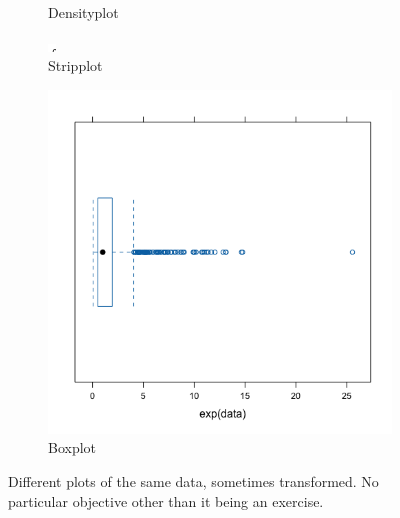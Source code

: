 \documentclass[10pt, fullpage, a4paper, titlepage]{article}
\begin{document}
\begin{figure}[h]
\begin{subfigure}{0.4\linewidth}
\caption{Densityplot}
\end{subfigure}
\hfill
\begin{subfigure}{0.4\linewidth}
\centering
\includegraphics[width = \linewidth]{stripplot.png}
\caption{Stripplot}
\end{subfigure}
\hfill
\begin{subfigure}{0.4\linewidth}
\centering
\includegraphics[width = \linewidth]{bwplot.png}
\caption{Boxplot}
\end{subfigure}
\caption{Different plots of the same data, sometimes transformed. No particular objective other than it being an exercise.}
\end{figure}
\end{document}
